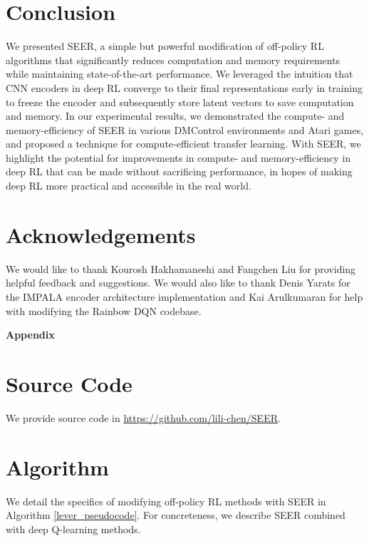 \documentclass{article}
\begin{document}
\section{Conclusion}
We presented SEER, a simple but powerful modification of off-policy RL algorithms that significantly reduces computation and memory requirements while maintaining state-of-the-art performance. We leveraged the intuition that CNN encoders in deep RL converge to their final representations early in training to freeze the encoder and subsequently store latent vectors to save computation and memory. In our experimental results, we demonstrated the compute- and memory-efficiency of SEER in various DMControl environments and Atari games, and proposed a technique for compute-efficient transfer learning. With SEER, we highlight the potential for improvements in compute- and memory-efficiency in deep RL that can be made without sacrificing performance, in hopes of making deep RL more practical and accessible in the real world. 

\section{Acknowledgements}
We would like to thank Kourosh Hakhamaneshi and Fangchen Liu for providing helpful feedback and suggestions.
We would also like to thank Denis Yarats for the IMPALA encoder architecture implementation and Kai Arulkumaran for help with modifying the Rainbow DQN codebase.









\newpage
\appendix
\onecolumn

\begin{center}{\bf {\LARGE Appendix}}
\end{center}

\section{Source Code} \label{appendix:source_code}
We provide source code in \url{https://github.com/lili-chen/SEER}.

\section{Algorithm} \label{appendix:pseudocode}
We detail the specifics of modifying off-policy RL methods with SEER in Algorithm \ref{lever_pseudocode}. For concreteness, we describe SEER combined with deep Q-learning methods.
\end{document}
